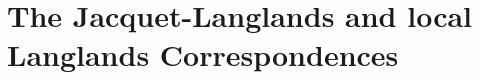 \documentclass[../main.tex]{subfiles}
\begin{document}
\section{The Jacquet-Langlands and local Langlands Correspondences}
\end{document}

